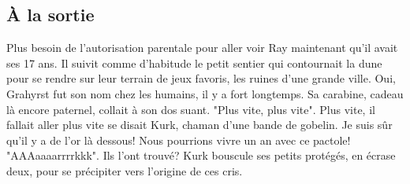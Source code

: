 \subsection{À la sortie}
Plus besoin de l'autorisation parentale pour aller voir Ray maintenant qu'il avait ses 17 ans. Il suivit comme d'habitude le petit sentier qui contournait la dune pour se rendre sur leur terrain de jeux favoris, les ruines d'une grande ville. Oui, Grahyrst fut son nom chez les humains, il y a fort longtemps. Sa carabine, cadeau là encore paternel, collait à son dos suant.
\newline
"Plus vite, plus vite". Plus vite, il fallait aller plus vite se disait Kurk, chaman d'une bande de gobelin. Je suis sûr qu'il y a de l'or là dessous! Nous pourrions vivre un an avec ce pactole! "AAAaaaarrrrkkk". Ils l'ont trouvé? Kurk bouscule ses petits protégés, en écrase deux, pour se précipiter vers l'origine de ces cris.